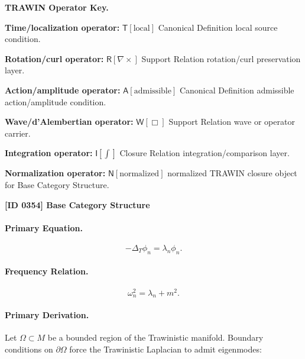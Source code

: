\par\vspace{0.45\baselineskip}
\noindent\begin{minipage}[t]{\linewidth}
\begingroup
\small
\raggedright
\textbf{TRAWIN Operator Key.}\par
\noindent\textbf{Time/localization operator:} $\mathsf{T}\!\left[\mathrm{local}\right]$ Canonical Definition local source condition.\par
\noindent\textbf{Rotation/curl operator:} $\mathsf{R}\!\left[\nabla\times\right]$ Support Relation rotation/curl preservation layer.\par
\noindent\textbf{Action/amplitude operator:} $\mathsf{A}\!\left[\mathrm{admissible}\right]$ Canonical Definition admissible action/amplitude condition.\par
\noindent\textbf{Wave/d'Alembertian operator:} $\mathsf{W}\!\left[\Box\right]$ Support Relation wave or operator carrier.\par
\noindent\textbf{Integration operator:} $\mathsf{I}\!\left[\int\right]$ Closure Relation integration/comparison layer.\par
\noindent\textbf{Normalization operator:} $\mathsf{N}\!\left[\mathrm{normalized}\right]$ normalized TRAWIN closure object for Base Category Structure.\par
\endgroup
\end{minipage}

\clearpage
\noindent\textbf{[ID 0354] Base Category Structure}\par
\vspace{0.35em}
\paragraph{Primary Equation.}
\begin{equation}
-\Delta_T \phi_n = \lambda_n \phi_n .
\end{equation}

\paragraph{Frequency Relation.}
\begin{equation}
\omega_n^2 = \lambda_n + m^2 .
\end{equation}

\paragraph{Primary Derivation.}
Let $\Omega\subset M$ be a bounded region of the Trawinistic manifold.  
Boundary conditions on $\partial\Omega$ force the Trawinistic Laplacian to admit eigenmodes:

